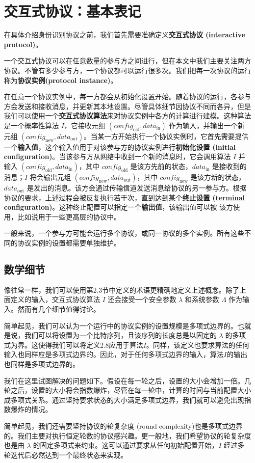 \section{交互式协议：基本表记}

在具体介绍身份识别协议之前，我们首先需要准确定义\textbf{交互式协议 (interactive protocol)}。

一个交互式协议可以在任意数量的参与方之间进行，但在本文中我们主要关注两方协议。不管有多少参与方，一个协议都可以运行很多次。我们把每一次协议的运行称为\textbf{协议实例(protocol instance)}。

在任意一个协议实例中，每一方都会从初始化设置开始。随着协议的运行，各参与方会发送和接收消息，并更新其本地设置。尽管具体细节因协议不同而各异，但是我们可以使用一个\textbf{交互式协议算法}来对协议实例中各方的计算进行建模。这种算法是一个概率性算法 $I$，它接收元组 $(\textit{config}_\mathrm{old}, \textit{data}_\mathrm{in})$ 作为输入，并输出一个新元组 $(\textit{config}_\mathrm{new}, \textit{data}_\mathrm{out})$。当某一方开始执行一个协议实例时，它首先需要提供一个\textbf{输入值}，这个输入值用于对该参与方的协议实例进行\textbf{初始化设置 (initial configuration)}。当该参与方从网络中收到一个新的消息时，它会调用算法 $I$ 并输入 $(\textit{config}_\mathrm{old}, \textit{data}_\mathrm{in})$，其中 $\textit{config}_\mathrm{old}$ 是该方先前的状态，$\textit{data}_\mathrm{in}$ 是接收到的消息；$I$ 将会输出元组 $(\textit{config}_\mathrm{new}, \textit{data}_\mathrm{out})$，其中 $\textit{config}_\mathrm{new}$ 是该方新的状态，$\textit{data}_\mathrm{out}$ 是发出的消息。该方会通过传输信道发送消息给协议的另一参与方。根据协议的要求，上述过程会被反复执行若干次，直到达到某个\textbf{终止设置 (terminal configuration)}。这种终止配置可以指定一个\textbf{输出值}，该输出值可以被
该方使用，比如说用于一些更高层的协议中。

一般来说，一个参与方可能会运行多个协议，或同一协议的多个实例。所有这些不同的协议实例的设置都需要单独维护。

\subsection{数学细节}

像往常一样，我们可以使用第2.3节中定义的术语更精确地定义上述概念。除了上面定义的输入，交互式协议算法 $I$ 还会接受一个安全参数 $\lambda$ 和系统参数 $\Lambda$ 作为输入。然而有几个细节值得讨论。

简单起见，我们可以认为一个运行中的协议实例的设置规模是多项式边界的。也就是说，我们可以将设置为一个比特序列，且该序列的长度总是以固定的 $\lambda$ 的多项式为界。这使得我们可以将定义2.8应用于算法$I$。同样，该定义也要求算法的任何输入也同样应是多项式边界的。因此，对于任何多项式边界的输入，算法$I$的输出也同样是多项式边界的。

我们在这里试图解决的问题如下。假设在每一轮之后，设置的大小会增加一倍。几轮之后，设置的大小将会指数爆炸，尽管在每一轮中，计算的时间与当前配置大小成多项式关系。通过坚持要求状态的大小满足多项式边界，我们就可以避免出现指数爆炸的情况。

简单起见，我们还需要坚持协议的轮复杂度 (round complexity)也是多项式边界的。我们主要对执行恒定轮数的协议感兴趣。更一般地，我们希望协议的轮复杂度也是由 $\lambda$ 的固定多项式来约束。这可以通过要求从任何初始配置开始，$I$ 经过多轮迭代后必然达到一个最终状态来实现。